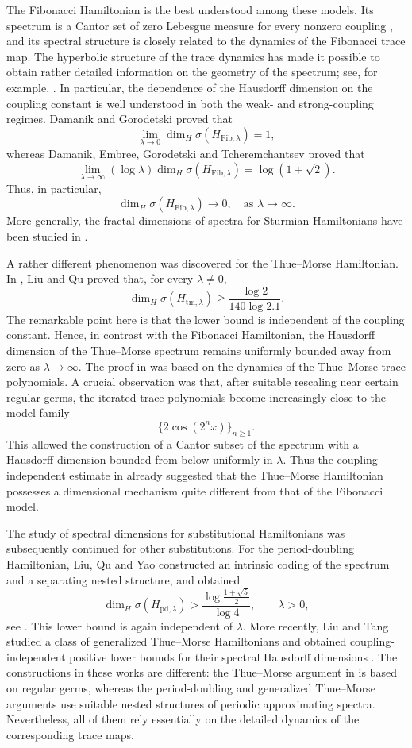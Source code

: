 \documentclass{amsart}
\theoremstyle{definition}
\begin{document}
The Fibonacci Hamiltonian is the best understood among these models.
Its spectrum is a Cantor set of zero Lebesgue measure for every nonzero
coupling \cite{Suto89}, and its spectral structure is closely related
to the dynamics of the Fibonacci trace map. The hyperbolic structure of
the trace dynamics has made it possible to obtain rather detailed
information on the geometry of the spectrum; see, for example,
\cite{Cas86,DG09}. In particular, the dependence of the Hausdorff
dimension on the coupling constant is well understood in both the weak-
and strong-coupling regimes. Damanik and Gorodetski proved that\cite{DG11}
\[
    \lim_{\lambda\to0}
    \dim_H \sigma(H_{\mathrm{Fib},\lambda})
    =1,
\]
whereas Damanik, Embree, Gorodetski and Tcheremchantsev proved that\cite{DEGT08}
\[
    \lim_{\lambda\to\infty}
    (\log\lambda)
    \dim_H \sigma(H_{\mathrm{Fib},\lambda})
    =
    \log(1+\sqrt{2}).
\]
Thus, in particular,
\[
    \dim_H \sigma(H_{\mathrm{Fib},\lambda})
    \rightarrow 0,
    \quad\text{as }\lambda\to\infty.
\]
More generally, the fractal dimensions of spectra for Sturmian
Hamiltonians have been studied in \cite{LW04,LPW07,LQW14}.

A rather different phenomenon was discovered for the Thue--Morse
Hamiltonian. In \cite{LQ15}, Liu and Qu proved that, for every
\(\lambda\ne0\),
\[
    \dim_H \sigma(H_{\mathrm{tm},\lambda})
    \geq
    \frac{\log 2}{140\log 2.1}.
\]
The remarkable point here is that the lower bound is independent of the
coupling constant. Hence, in contrast with the Fibonacci Hamiltonian,
the Hausdorff dimension of the Thue--Morse spectrum remains uniformly
bounded away from zero as \(\lambda\to\infty\). The proof in
\cite{LQ15} was based on the dynamics of the Thue--Morse trace
polynomials. A crucial observation was that, after suitable rescaling
near certain regular germs, the iterated trace polynomials become
increasingly close to the model family
\[
    \{2\cos(2^n x)\}_{n\geq1}.
\]
This allowed the construction of a Cantor subset of the spectrum with a
Hausdorff dimension bounded from below uniformly in \(\lambda\).
Thus the coupling-independent estimate in \cite{LQ15} already suggested
that the Thue--Morse Hamiltonian possesses a dimensional mechanism quite
different from that of the Fibonacci model.

The study of spectral dimensions for substitutional Hamiltonians was
subsequently continued for other substitutions. For the period-doubling
Hamiltonian, Liu, Qu and Yao constructed an intrinsic coding of the
spectrum and a separating nested structure, and obtained
\[
    \dim_H \sigma(H_{\mathrm{pd},\lambda})
    >
    \frac{\log\frac{1+\sqrt{5}}{2}}{\log 4},
    \qquad \lambda>0,
\]
see \cite{LQY22}. This lower bound is again independent of \(\lambda\).
More recently, Liu and Tang studied a class of generalized Thue--Morse
Hamiltonians and obtained coupling-independent positive lower bounds
for their spectral Hausdorff dimensions \cite{LT23}. The constructions
in these works are different: the Thue--Morse argument in \cite{LQ15}
is based on regular germs, whereas the period-doubling and generalized
Thue--Morse arguments use suitable nested structures of periodic
approximating spectra. Nevertheless, all of them rely essentially on
the detailed dynamics of the corresponding trace maps.
\end{document}
